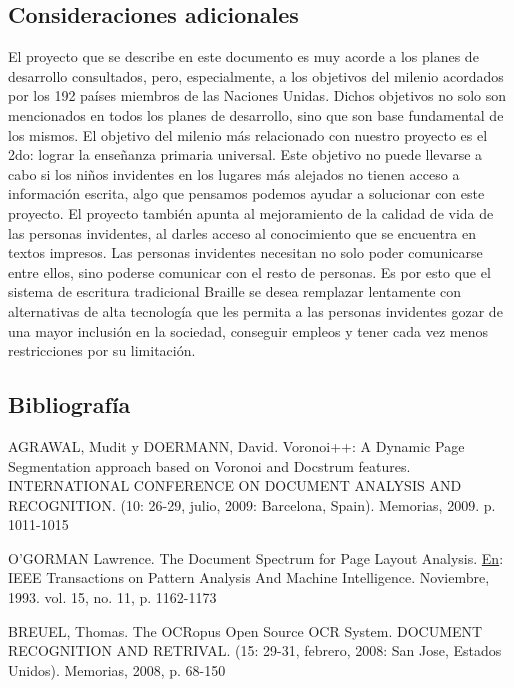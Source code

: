 \documentclass[a4paper, 12pt, oneside]{article}
\begin{document}
	\clearpage
	
	\begin{center}
	\section{Consideraciones adicionales}
	\end{center}

	El proyecto que se describe en este documento es muy acorde a los planes de desarrollo consultados, pero, especialmente, a los objetivos del milenio acordados por los 192 países miembros de las Naciones Unidas. Dichos objetivos no solo son mencionados en todos los planes de desarrollo, sino que son base fundamental de los mismos. El objetivo del milenio más relacionado con nuestro proyecto es el 2do: lograr la enseñanza primaria universal. Este objetivo no puede llevarse a cabo si los niños invidentes en los lugares más alejados no tienen acceso a información escrita, algo que pensamos podemos ayudar a solucionar con este proyecto.
	El proyecto también apunta al mejoramiento de la calidad de vida de las personas invidentes, al darles
	acceso al conocimiento que se encuentra en textos impresos. Las personas invidentes necesitan no solo
	poder comunicarse entre ellos, sino poderse comunicar con el resto de personas. Es por esto que el sistema
	de escritura tradicional Braille se desea remplazar lentamente con alternativas de alta tecnología
	que les permita a las personas invidentes gozar de una mayor inclusión en la sociedad, conseguir empleos
	y tener cada vez menos restricciones por su limitación.
	
	\clearpage
	\begin{center}
	\section{Bibliografía}
	\end{center}
	AGRAWAL, Mudit y DOERMANN, David. Voronoi++: A Dynamic Page Segmentation approach based on Voronoi and Docstrum features. INTERNATIONAL CONFERENCE ON DOCUMENT ANALYSIS AND RECOGNITION. (10: 26-29, julio, 2009: Barcelona, Spain). Memorias, 2009. p. 1011-1015
	
	O'GORMAN Lawrence. The Document Spectrum for Page Layout Analysis. \underline{En}: IEEE Transactions on Pattern Analysis And Machine Intelligence. Noviembre, 1993. vol. 15, no. 11, p. 1162-1173
	
	BREUEL, Thomas. The OCRopus Open Source OCR System. DOCUMENT RECOGNITION AND RETRIVAL. (15: 29-31, febrero, 2008: San Jose, Estados Unidos). Memorias, 2008, p. 68-150
	
\end{document}
